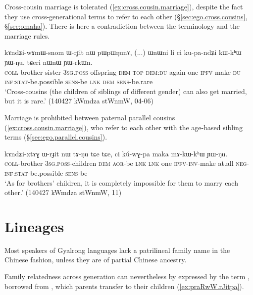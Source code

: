 Cross-cousin marriage is tolerated (\ref{ex:cross.cousin.marriage}), despite the fact they use cross-generational terms to refer to each other (§\ref{sec:ego.cross.cousins}, §\ref{sec:omaha}). There is here a contradiction between the terminology and the marriage rules.

\begin{exe}
\ex \label{ex:cross.cousin.marriage}
\gll kɤndʑi-wɤmɯ-snom ɯ-rɟit nɯ pɯpɯŋunɤ, (...) ɯnɯni li ci ku-pa-ndʑi kɯ-kʰɯ ɲɯ-ŋu. tɕeri nɯnɯ ɲɯ-rkɯn. \\
\textsc{coll}-brother-sister \textsc{3sg}.\textsc{poss}-offspring \textsc{dem} \textsc{top} { } \textsc{dem}:\textsc{du} again one \textsc{ipfv}-make-\textsc{du} \textsc{inf}:\textsc{stat}-be.possible \textsc{sens}-be \textsc{lnk} \textsc{dem} \textsc{sens}-be.rare \\ 
\glt `Cross-cousins (the children of siblings of different gender) can also get married, but it is rare.' (140427 kWmdza stWnmW, 04-06)
\end{exe}

Marriage is prohibited between paternal parallel cousins (\ref{ex:cross.cousin.marriage}), who refer to each other with the age-based sibling terms (§\ref{sec:ego.parallel.cousins}).

\begin{exe}
\ex \label{ex:FBCh.marriage}
\gll kɤndʑi-xtɤɣ ɯ-rɟit nɯ tɤ-ŋu tɕe tɕe, ci kú-wɣ-pa maka mɤ-kɯ-kʰɯ ɲɯ-ŋu. \\
\textsc{coll}-brother \textsc{3sg}.\textsc{poss}-children \textsc{dem} \textsc{aor}-be \textsc{lnk} \textsc{lnk} one \textsc{ipfv}-\textsc{inv}-make at.all \textsc{neg}-\textsc{inf}:\textsc{stat}-be.possible \textsc{sens}-be \\
\glt `As for brothers' children, it is completely impossible for them to marry each other.' (140427 kWmdza stWnmW, 11)
\end{exe}

\section{Lineages} \label{sec:lineage.kinship}
Most speakers of Gyalrong languages lack a patrilineal family name in the Chinese fashion, unless they are of partial Chinese ancestry. 

Family relatedness across generation can nevertheless by expressed by the term , borrowed from , which parents transfer to their children (\ref{ex:praRwW.rJitpa}).

